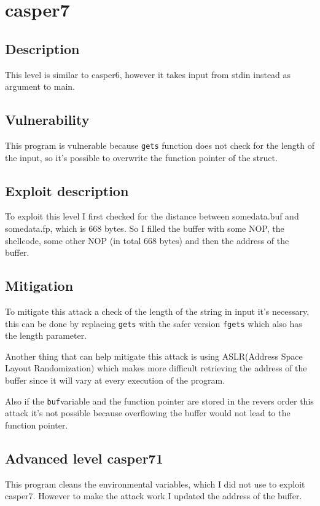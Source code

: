 \documentclass[a4paper,12pt]{article}
\begin{document}
\section{casper7}
\subsection{Description}
This level is similar to casper6, however it takes input from stdin instead as argument to main.


\subsection{Vulnerability}
This program is vulnerable because \texttt{gets} function does not check for the length of the input, so it's possible to overwrite the function pointer of the struct.

\subsection{Exploit description} 

To exploit this level I first checked for the distance between somedata.buf and somedata.fp, which is 668 bytes.
So I filled the buffer with some NOP, the shellcode, some other NOP (in total 668 bytes) and then the address of the buffer.



\subsection{Mitigation}

To mitigate this attack a check of the length of the string in input it's necessary, this can be done by replacing \texttt{gets} with the safer version \texttt{fgets} which also has the length parameter.

Another thing that can help mitigate this attack is using ASLR(Address Space Layout Randomization)
which makes more difficult retrieving the address of the buffer since it will vary at every execution of the program.

Also if the \texttt{buf}variable and the function pointer are stored in the revers order this attack it's not possible because overflowing the buffer would not lead to the function pointer.

\subsection{Advanced level casper71}
This program cleans the environmental variables, which I did not use to exploit casper7. However to make the attack work I updated the address of the buffer.
\end{document}

